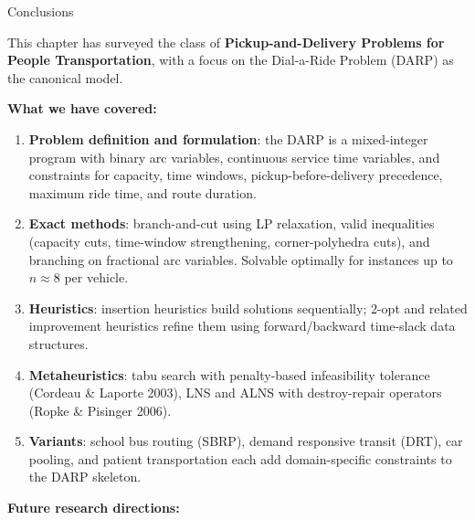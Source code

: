 \documentclass[aspectratio=169,10pt]{beamer}
\begin{document}
\begin{frame}[allowframebreaks]{Conclusions}

  This chapter has surveyed the class of \textbf{Pickup-and-Delivery Problems
  for People Transportation}, with a focus on the Dial-a-Ride Problem (DARP)
  as the canonical model.

  \textbf{What we have covered:}
  \begin{enumerate}
    \item \textbf{Problem definition and formulation}: the DARP is a
          mixed-integer program with binary arc variables, continuous service
          time variables, and constraints for capacity, time windows,
          pickup-before-delivery precedence, maximum ride time, and route
          duration.
    \item \textbf{Exact methods}: branch-and-cut using LP relaxation,
          valid inequalities (capacity cuts, time-window strengthening,
          corner-polyhedra cuts), and branching on fractional arc variables.
          Solvable optimally for instances up to $n \approx 8$ per vehicle.
    \item \textbf{Heuristics}: insertion heuristics build solutions
          sequentially; 2-opt and related improvement heuristics refine
          them using forward/backward time-slack data structures.
    \item \textbf{Metaheuristics}: tabu search with penalty-based
          infeasibility tolerance (Cordeau \& Laporte 2003), LNS and ALNS
          with destroy-repair operators (Ropke \& Pisinger 2006).
    \item \textbf{Variants}: school bus routing (SBRP), demand responsive
          transit (DRT), car pooling, and patient transportation each
          add domain-specific constraints to the DARP skeleton.
  \end{enumerate}

  \framebreak

  \textbf{Future research directions:}


\end{frame}
\end{document}
